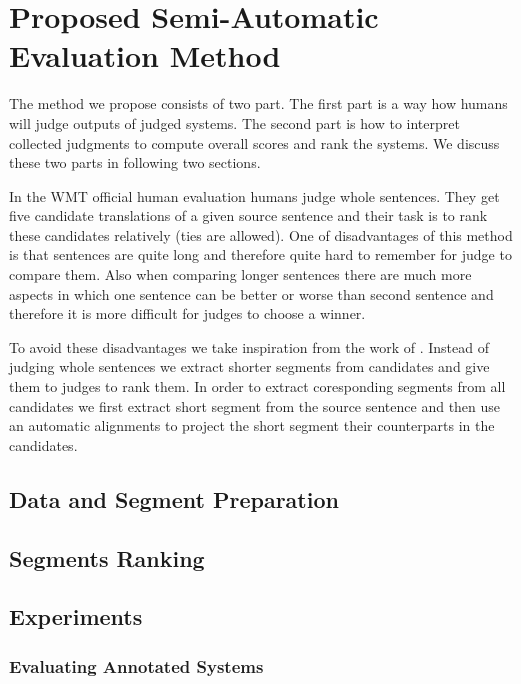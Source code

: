 \chapter{Proposed Semi-Automatic Evaluation Method}

The method we propose consists of two part. The first part is a way how humans
will judge outputs of judged systems. The second part is how to interpret
collected judgments to compute overall scores and rank the systems. We discuss
these two parts in following two sections.

In the WMT official human evaluation humans judge whole sentences. They get
five candidate translations of a given source sentence and their task is to
rank these candidates relatively (ties are allowed). One of disadvantages of
this method is that sentences are quite long and therefore quite hard to
remember for judge to compare them. Also when comparing longer sentences there
are much more aspects in which one sentence can be better or worse than second
sentence and therefore it is more difficult for judges to choose a winner. 

To avoid these disadvantages we take inspiration from the work of . Instead of judging whole sentences
we extract shorter segments from candidates and give them to judges to rank
them. In order to extract coresponding segments from all candidates we first
extract short segment from the source sentence and then use an automatic alignments
to project the short segment their counterparts in the candidates.


\section{Data and Segment Preparation}

\section{Segments Ranking}

\section{Experiments}

\subsection{Evaluating Annotated Systems}

